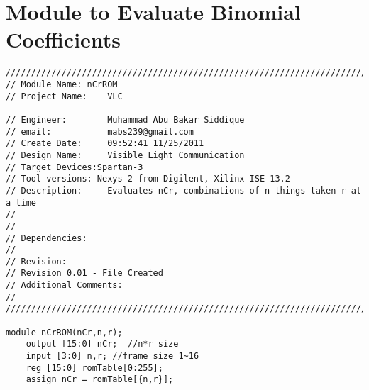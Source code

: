 \section{Module to Evaluate Binomial Coefficients }
\label{sec:nCrROM}
\begin{lstlisting}[style=verilog-style,basicstyle=\tiny]
//////////////////////////////////////////////////////////////////////////////////
// Module Name:	nCrROM
// Project Name: 	VLC

// Engineer: 		Muhammad Abu Bakar Siddique
// email:			mabs239@gmail.com
// Create Date:  	09:52:41 11/25/2011 
// Design Name: 	Visible Light Communication
// Target Devices:Spartan-3 
// Tool versions: Nexys-2 from Digilent, Xilinx ISE 13.2
// Description: 	Evaluates nCr, combinations of n things taken r at a time
//						
//
// Dependencies: 	
//
// Revision: 
// Revision 0.01 - File Created
// Additional Comments: 
//
//////////////////////////////////////////////////////////////////////////////////

module nCrROM(nCr,n,r);
	output [15:0] nCr;  //n*r size
	input [3:0] n,r; //frame size 1~16
	reg [15:0] romTable[0:255];
	assign nCr = romTable[{n,r}];
	

\end{lstlisting}
